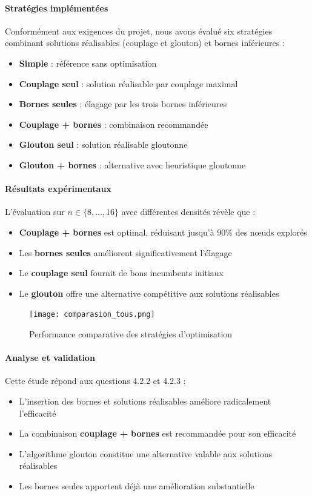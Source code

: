 \documentclass[11pt,a4paper]{article}
\begin{document}
\paragraph{Stratégies implémentées}
Conformément aux exigences du projet, nous avons évalué six stratégies combinant solutions réalisables (couplage et glouton) et bornes inférieures :
\begin{itemize}
  \item \textbf{Simple} : référence sans optimisation
  \item \textbf{Couplage seul} : solution réalisable par couplage maximal
  \item \textbf{Bornes seules} : élagage par les trois bornes inférieures
  \item \textbf{Couplage + bornes} : combinaison recommandée
  \item \textbf{Glouton seul} : solution réalisable gloutonne
  \item \textbf{Glouton + bornes} : alternative avec heuristique gloutonne
\end{itemize}

\paragraph{Résultats expérimentaux}
L'évaluation sur $n \in \{8,\dots,16\}$ avec différentes densités révèle que :

\begin{itemize}
  \item \textbf{Couplage + bornes} est optimal, réduisant jusqu'à 90\% des nœuds explorés
  \item Les \textbf{bornes seules} améliorent significativement l'élagage
  \item Le \textbf{couplage seul} fournit de bons incumbents initiaux
  \item Le \textbf{glouton} offre une alternative compétitive aux solutions réalisables
\end{itemize}

\begin{figure}[H]
  \centering
  \texttt{[image: comparasion\_tous.png]}
  \caption{Performance comparative des stratégies d'optimisation}
\end{figure}

\paragraph{Analyse et validation}
Cette étude répond aux questions 4.2.2 et 4.2.3 :
\begin{itemize}
  \item L'insertion des bornes et solutions réalisables améliore radicalement l'efficacité
  \item La combinaison \textbf{couplage + bornes} est recommandée pour son efficacité
  \item L'algorithme glouton constitue une alternative valable aux solutions réalisables
  \item Les bornes seules apportent déjà une amélioration substantielle
\end{itemize}
\end{document}

